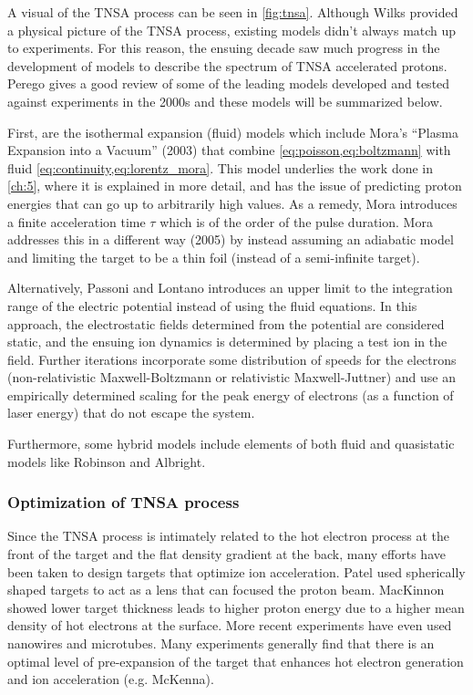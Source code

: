 A visual of the TNSA process can be seen in \cref{fig:tnsa}. Although Wilks\cite{Wilks_2001_PoP} provided a physical picture of the TNSA process, existing models didn't always match up to experiments. For this reason, the ensuing decade saw much progress in the development of models to describe the spectrum of TNSA accelerated protons. Perego\cite{Perego_2011_NIaMiP} gives a good review of some of the leading models developed and tested against experiments in the 2000s and these models will be summarized below. 

First, are the isothermal expansion (fluid) models which include Mora's ``Plasma Expansion into a Vacuum''\cite{Mora_2003_PRL} (2003) that combine \cref{eq:poisson,eq:boltzmann} with fluid \cref{eq:continuity,eq:lorentz_mora}. This model underlies the work done in \cref{ch:5}, where it is explained in more detail, and has the issue of predicting proton energies that can go up to arbitrarily high values. As a remedy, Mora introduces a finite acceleration time $\tau$ which is of the order of the pulse duration. Mora\cite{Mora_2005_PRE} addresses this in a different way (2005) by instead assuming an adiabatic model and limiting the target to be a thin foil (instead of a semi-infinite target). 

Alternatively, Passoni and Lontano\cite{Passoni_2004_LaPB} introduces an upper limit to the integration range of the electric potential instead of using the fluid equations. In this approach, the electrostatic fields determined from the potential are considered static, and the ensuing ion dynamics is determined by placing a test ion in the field. Further iterations incorporate some distribution of speeds for the electrons (non-relativistic Maxwell-Boltzmann\cite{Lontano_2006_PoP} or relativistic Maxwell-Juttner\cite{Passoni_2008_PRL}) and use an empirically determined scaling for the peak energy of electrons (as a function of laser energy) that do not escape the system\cite{Perego_2012_RevSci}.

Furthermore, some hybrid models include elements of both fluid and quasistatic models like Robinson\cite{Robinson_2006_PRL} and Albright\cite{Albright_2006_PRL}.

\subsubsection{Optimization of TNSA process} \label{sec:tnsa_opt}

Since the TNSA process is intimately related to the hot electron process at the front of the target and the flat density gradient at the back, many efforts have been taken to design targets that optimize ion acceleration. Patel\cite{Patel_2003_PRL} used spherically shaped targets to act as a lens that can focused the proton beam. MacKinnon\cite{Mackinnon_2002_PRL} showed lower target thickness leads to higher proton energy due to a higher mean density of hot electrons at the surface. More recent experiments have even used nanowires\cite{Vallieres_2021_Nature} and microtubes\cite{Strehlow_2022_Nature}. Many experiments generally find that there is an optimal level of pre-expansion of the target that enhances hot electron generation and ion acceleration (e.g. McKenna\cite{McKenna_2008_LaPB}).

